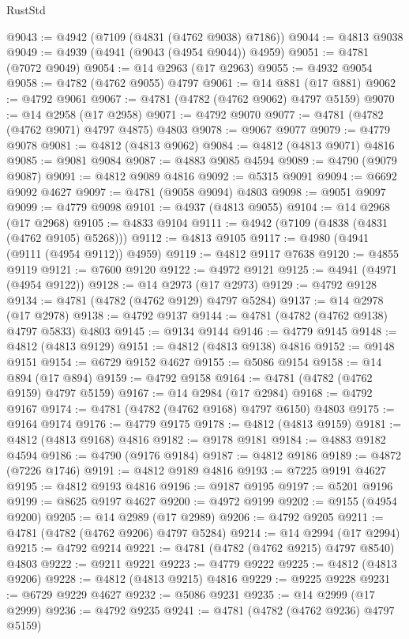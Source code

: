 \begin{lexlean}{RustStd}
\begin{coremodule}
@9043 := @4942 (@7109 (@4831 (@4762 @9038) @7186))
@9044 := @4813 @9038
@9049 := @4939 (@4941 (@9043 (@4954 @9044)) @4959)
@9051 := @4781 (@7072 @9049)
@9054 := @14 @2963 (@17 @2963)
@9055 := @4932 @9054
@9058 := @4782 (@4762 @9055) @4797
@9061 := @14 @881 (@17 @881)
@9062 := @4792 @9061
@9067 := @4781 (@4782 (@4762 @9062) @4797 @5159)
@9070 := @14 @2958 (@17 @2958)
@9071 := @4792 @9070
@9077 := @4781 (@4782 (@4762 @9071) @4797 @4875) @4803
@9078 := @9067 @9077
@9079 := @4779 @9078
@9081 := @4812 (@4813 @9062)
@9084 := @4812 (@4813 @9071) @4816
@9085 := @9081 @9084
@9087 := @4883 @9085 @4594
@9089 := @4790 (@9079 @9087)
@9091 := @4812 @9089 @4816
@9092 := @5315 @9091
@9094 := @6692 @9092 @4627
@9097 := @4781 (@9058 @9094) @4803
@9098 := @9051 @9097
@9099 := @4779 @9098
@9101 := @4937 (@4813 @9055)
@9104 := @14 @2968 (@17 @2968)
@9105 := @4833 @9104
@9111 := @4942 (@7109 (@4838 (@4831 (@4762 @9105) @5268)))
@9112 := @4813 @9105
@9117 := @4980 (@4941 (@9111 (@4954 @9112)) @4959)
@9119 := @4812 @9117 @7638
@9120 := @4855 @9119
@9121 := @7600 @9120
@9122 := @4972 @9121
@9125 := @4941 (@4971 (@4954 @9122))
@9128 := @14 @2973 (@17 @2973)
@9129 := @4792 @9128
@9134 := @4781 (@4782 (@4762 @9129) @4797 @5284)
@9137 := @14 @2978 (@17 @2978)
@9138 := @4792 @9137
@9144 := @4781 (@4782 (@4762 @9138) @4797 @5833) @4803
@9145 := @9134 @9144
@9146 := @4779 @9145
@9148 := @4812 (@4813 @9129)
@9151 := @4812 (@4813 @9138) @4816
@9152 := @9148 @9151
@9154 := @6729 @9152 @4627
@9155 := @5086 @9154
@9158 := @14 @894 (@17 @894)
@9159 := @4792 @9158
@9164 := @4781 (@4782 (@4762 @9159) @4797 @5159)
@9167 := @14 @2984 (@17 @2984)
@9168 := @4792 @9167
@9174 := @4781 (@4782 (@4762 @9168) @4797 @6150) @4803
@9175 := @9164 @9174
@9176 := @4779 @9175
@9178 := @4812 (@4813 @9159)
@9181 := @4812 (@4813 @9168) @4816
@9182 := @9178 @9181
@9184 := @4883 @9182 @4594
@9186 := @4790 (@9176 @9184)
@9187 := @4812 @9186
@9189 := @4872 (@7226 @1746)
@9191 := @4812 @9189 @4816
@9193 := @7225 @9191 @4627
@9195 := @4812 @9193 @4816
@9196 := @9187 @9195
@9197 := @5201 @9196
@9199 := @8625 @9197 @4627
@9200 := @4972 @9199
@9202 := @9155 (@4954 @9200)
@9205 := @14 @2989 (@17 @2989)
@9206 := @4792 @9205
@9211 := @4781 (@4782 (@4762 @9206) @4797 @5284)
@9214 := @14 @2994 (@17 @2994)
@9215 := @4792 @9214
@9221 := @4781 (@4782 (@4762 @9215) @4797 @8540) @4803
@9222 := @9211 @9221
@9223 := @4779 @9222
@9225 := @4812 (@4813 @9206)
@9228 := @4812 (@4813 @9215) @4816
@9229 := @9225 @9228
@9231 := @6729 @9229 @4627
@9232 := @5086 @9231
@9235 := @14 @2999 (@17 @2999)
@9236 := @4792 @9235
@9241 := @4781 (@4782 (@4762 @9236) @4797 @5159)

\end{coremodule}
\end{lexlean}
